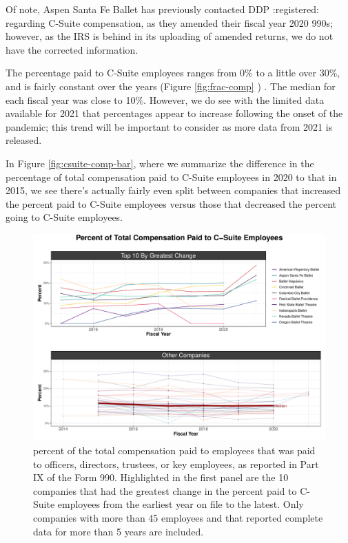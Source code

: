 \documentclass[Dance Data
Project,article,submit,moreauthors,pdftex]{mdpi}
\begin{document}
Of note, Aspen Santa Fe Ballet has previously contacted DDP :registered:
regarding C-Suite compensation, as they amended their fiscal year 2020
990s; however, as the IRS is behind in its uploading of amended returns,
we do not have the corrected information.

The percentage paid to C-Suite employees ranges from 0\% to a little
over 30\%, and is fairly constant over the years (Figure
\ref{fig:frac-comp} ) . The median for each fiscal year was close to
10\%. However, we do see with the limited data available for 2021 that
percentages appear to increase following the onset of the pandemic; this
trend will be important to consider as more data from 2021 is released.

In Figure \ref{fig:csuite-comp-bar}, where we summarize the difference
in the percentage of total compensation paid to C-Suite employees in
2020 to that in 2015, we see there's actually fairly even split between
companies that increased the percent paid to C-Suite employees versus
those that decreased the percent going to C-Suite employees.

\begin{figure}[H]
\includegraphics[width=0.9\linewidth,]{../images/frac-comp} \caption{\label{fig:frac-comp} percent of the total compensation paid to employees that was paid to officers, directors, trustees, or key employees, as reported in Part IX of the Form 990. Highlighted in the first panel are the 10 companies that had the greatest change in the percent paid to C-Suite employees from the earliest year on file to the latest. Only companies with more than 45 employees and that reported complete data for more than 5 years are included.}\label{fig:unnamed-chunk-17}
\end{figure}
\end{document}
